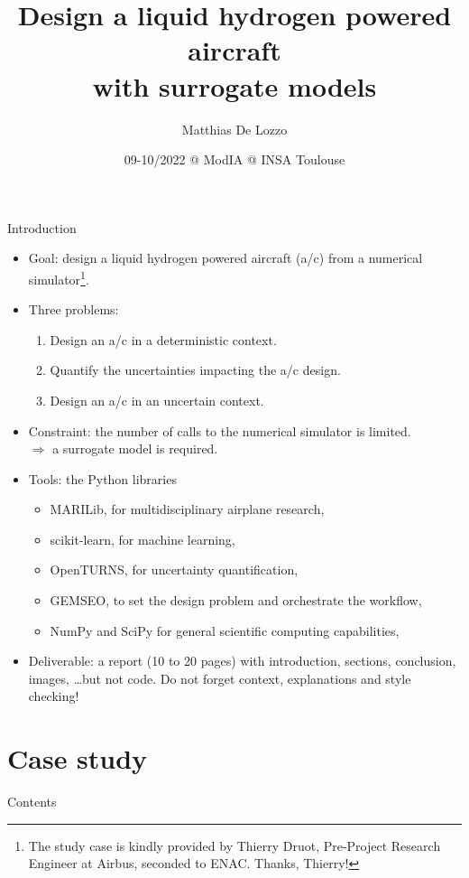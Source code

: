 \documentclass[aspectratio=169]{beamer}
\title{Design a liquid hydrogen powered aircraft\\with surrogate models}
\author{Matthias De Lozzo}
\institute{matthias.delozzo[at]irt-saintexupery[dot]com}
\date{09-10/2022 @ ModIA @ INSA Toulouse}
\begin{document}
\frame{\titlepage}

\begin{frame}{Introduction}
    \begin{itemize}
        \item Goal: design a liquid hydrogen powered aircraft (a/c) from a numerical simulator\footnote{The study case is kindly provided by Thierry Druot, Pre-Project Research Engineer at Airbus, seconded to ENAC.
              Thanks, Thierry!}.
        \item Three problems:
        \begin{enumerate}
            \item Design an a/c in a deterministic context.
            \item Quantify the uncertainties impacting the a/c design.
            \item Design an a/c in an uncertain context.
        \end{enumerate}
        \item Constraint: the number of calls to the numerical simulator is limited.\\
              $\Rightarrow$ a surrogate model is required.
        \item Tools: the Python libraries
        \begin{itemize}
            \item MARILib, for multidisciplinary airplane research,
            \item scikit-learn, for machine learning,
            \item OpenTURNS\@, for uncertainty quantification,
            \item GEMSEO, to set the design problem and orchestrate the workflow,
            \item NumPy and SciPy for general scientific computing capabilities,
        \end{itemize}
        \item Deliverable: a report (10 to 20 pages) with introduction, sections, conclusion, images, \ldots but not code.
              Do not forget context, explanations and style checking!
    \end{itemize}
\end{frame}

\section{Case study}\label{sec:use-case}

\begin{frame}{Contents}
    \tableofcontents
\end{frame}
\end{document}
